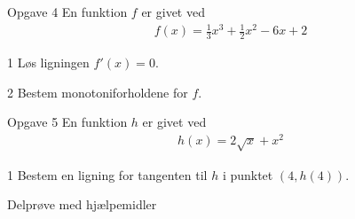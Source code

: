 \documentclass[12pt,x11names,a4paper]{article}
\begin{document}
\begin{opgavetekst}{Opgave 4}
	En funktion $f$ er givet ved
	\begin{align*}
		f(x) = \frac{1}{3}x^3 + \frac{1}{2}x^2 - 6x + 2
	\end{align*}
\end{opgavetekst}

\begin{delopgave}{}{1}
	Løs ligningen $f'(x) = 0$.
\end{delopgave}
\begin{delopgave}{}{2}
	Bestem monotoniforholdene for $f$. 
\end{delopgave}

\begin{opgavetekst}{Opgave 5}
	En funktion $h$ er givet ved
	\begin{align*}
		h(x) = 2\sqrt{x} + x^2
	\end{align*}
\end{opgavetekst}
\begin{delopgave}{}{1}
	Bestem en ligning for tangenten til $h$ i punktet $(4,h(4))$.
\end{delopgave}


\newpage

\begin{center}
\LARGE
Delprøve med hjælpemidler 
\end{center}
\end{document}
